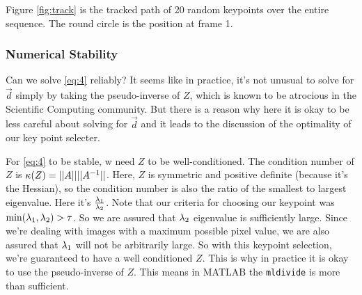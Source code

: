 Figure \ref{fig:track} is the tracked path of 20 random keypoints over
the entire sequence. The round circle is the position at frame 1.

\subsubsection{Numerical Stability}
\label{sec:numerical-stability}
Can we solve \eqref{eq:4} reliably? It seems like in practice, it's
not unusual to solve for $\vec d$ simply by taking the pseudo-inverse of $Z$,
which is known to be atrocious in the Scientific Computing
community. But there is a reason why here it is okay to be less
careful about solving for $\vec d$ and it leads to the discussion of
the optimality of our key point selecter.

For \eqref{eq:4} to be stable, w need $Z$ to be
well-conditioned. The condition number of $Z$ is $\kappa(Z) =
||A||||A^{-1}||$. Here, $Z$ is symmetric and positive definite (because
it's the Hessian), so the condition number is also the ratio of the
smallest to largest eigenvalue. Here it's $\frac{\lambda_1}{\lambda_2}$.
Note that our criteria for choosing our keypoint was $\min(\lambda_1,
\lambda_2) > \tau$. So we are assured that $\lambda_2$ eigenvalue is
sufficiently large. Since we're dealing with images with a maximum
possible pixel value, we are also assured that $\lambda_1$ will not be
arbitrarily large. So with this keypoint selection, we're guaranteed to
have a well conditioned $Z$. This is why in practice it is okay to use the pseudo-inverse
of $Z$. This means in MATLAB the \texttt{mldivide} is more than
sufficient.


